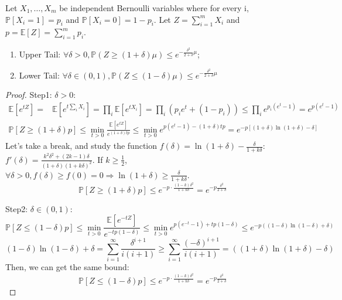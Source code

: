 \begin{theorem}
    Let $ X_1, \ldots, X_m $ be independent Bernoulli variables where for every i, $ \mathbb{P}\left[ X_i = 1 \right] = p_i $ and $ \mathbb{P} \left[ X_i = 0 \right] = 1-p_i $. Let $ Z = \sum^{m}_{i=1} X_i $ and $ p = \mathbb{E} \left[ Z  \right] = \sum^{m}_{i=1} p_i $.
    \begin{enumerate}
        \item Upper Tail: $ \forall \delta > 0, \mathbb{P}(Z \ge (1+\delta) \mu) \le e ^{-\frac{\delta^2}{2+\delta} \mu} $;
        \item Lower Tail: $ \forall \delta \in (0,1), \mathbb{P}(Z \le (1-\delta) \mu) \le e ^{-\frac{\delta^2}{2+\delta} \mu}$
    \end{enumerate}
    \begin{proof}
        Step1: $ \delta > 0 $:
        \begin{align*}
            \mathbb{E}\left[ e^{tZ} \right] =& \mathbb{E} \left[ e^{t \sum^{}_{i} X_i} \right] = \prod_i \mathbb{E} \left[ e^{tX_i} \right] = \prod_i \left( p_i e^t + (1 - p_i) \right) \le \prod_i e^{p_i (e^t - 1)} = e^{p(e^t - 1)}
        \end{align*}
        \begin{align*}
            \mathbb{P}\left[ Z \ge (1+\delta) p \right] \le \min_{t > 0} \frac{\mathbb{E} \left[ e^{tZ} \right]}{e^{(1+\delta)tp}} \le \min_{t > 0} e^{p(e^t - 1) - (1+\delta) tp} = e ^{- p \left[ (1+\delta)\ln(1+\delta) - \delta \right]}
        \end{align*}
        Let's take a break, and study the function $ f(\delta) = \ln(1+\delta) - \frac{\delta}{1+k\delta} $:
        $ f'(\delta) = \frac{k^2 \delta^2 + (2k - 1)\delta}{(1+\delta) {(1+ k \delta)}^2} $.
        If $ k \ge \frac{1}{2} $, $ \forall \delta > 0, f(\delta) \ge f(0) = 0 \Rightarrow \ln(1+\delta) \ge \frac{\delta}{1+k \delta}$.
        \[
            \mathbb{P}\left[ Z \ge (1+\delta)p \right] \le e^{-p \cdot \frac{(1-k)\delta^2}{1+k\delta} } = e^{-p \frac{\delta^2}{2 + \delta} }
        \]

        Step2: $ \delta \in (0, 1) $:
        \[
            \mathbb{P} \left[ Z \le (1 - \delta) p \right] \le \min_{t > 0} \frac{\mathbb{E}\left[ e^{-tZ} \right]}{e ^{-tp(1-\delta)}} \le \min_{t > 0} e^{p(e^{-t} - 1) + tp(1 - \delta)} \le e^{-p ( (1 - \delta) \ln(1-\delta) + \delta )}
        \]
        \[
            (1 - \delta)\ln(1-\delta)  + \delta = \sum^{\infty}_{i=1} \frac{\delta^{i+1}}{i(i+1)} \ge \sum^{\infty}_{i=1} \frac{{(-\delta)}^{i+1}}{i(i+1)} = ((1 + \delta) \ln(1 + \delta) - \delta) 
        \]
        Then, we can get the same bound:
        \[
            \mathbb{P}\left[ Z \le (1-\delta)p \right] \le e^{-p \cdot \frac{(1-k)\delta^2}{1+k\delta} } = e^{-p \frac{\delta^2}{2 + \delta} }
        \]
    \end{proof}
\end{theorem}

